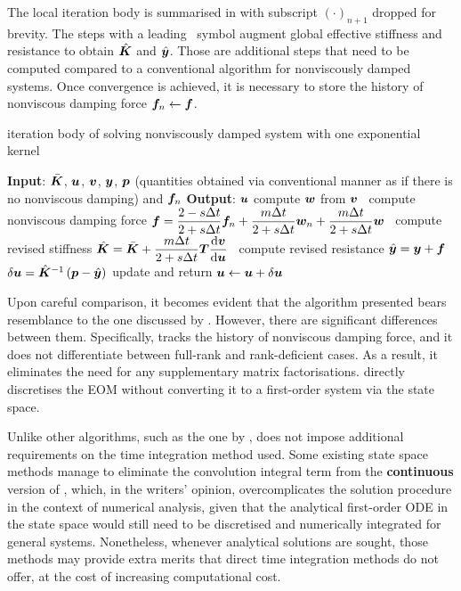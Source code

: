 The local iteration body is summarised in  with subscript $\left(\cdot\right)_{n+1}$ dropped for brevity.
The steps with a leading \faMicrochip~symbol augment global effective stiffness and resistance to obtain $\hat{\bm{K}}$ and $\hat{\bm{y}}$. Those are additional steps that need to be computed compared to a conventional algorithm for nonviscously damped systems. Once convergence is achieved, it is necessary to store the history of nonviscous damping force $\bm{f}_n\leftarrow\bm{f}$.
\begin{breakablealgorithm}
\caption{iteration body of solving nonviscously damped system with one exponential kernel}\label{algo:single_model}
\begin{algorithmic}
\State \textbf{Input}: $\bar{\bm{K}}$, $\bm{u}$, $\bm{v}$, $\bm{y}$, $\bm{p}$ (quantities obtained via conventional manner as if there is no nonviscous damping) and $\bm{f}_n$
\State \textbf{Output}: $\bm{u}$
\State compute $\bm{w}$ from $\bm{v}$
\State \faMicrochip~compute nonviscous damping force $\bm{f}=\dfrac{2-s\Delta{}t}{2+s\Delta{}t}\bm{f}_n+\dfrac{m\Delta{}t}{2+s\Delta{}t}\bm{w}_n+\dfrac{m\Delta{}t}{2+s\Delta{}t}\bm{w}$
\State \faMicrochip~compute revised stiffness $\hat{\bm{K}}=\bar{\bm{K}}+\dfrac{m\Delta{}t}{2+s\Delta{}t}\bm{T}\dfrac{\mathrm{d}\bm{v}}{\mathrm{d}\bm{u}}$
\State \faMicrochip~compute revised resistance $\hat{\bm{y}}=\bm{y}+\bm{f}$
\State $\delta\bm{u}=\hat{\bm{K}}^{-1}\left(\bm{p}-\hat{\bm{y}}\right)$
\State update and return $\bm{u}\leftarrow\bm{u}+\delta\bm{u}$
\end{algorithmic}
\end{breakablealgorithm}

Upon careful comparison, it becomes evident that the algorithm presented bears resemblance to the one discussed by \citet{Adhikari2004}. However, there are significant differences between them. Specifically,  tracks the history of nonviscous damping force, and it does not differentiate between full-rank and rank-deficient cases. As a result, it eliminates the need for any supplementary matrix factorisations.  directly discretises the EOM without converting it to a first-order system via the state space.

Unlike other algorithms, such as the one by \citet{Cortes2009},  does not impose additional requirements on the time integration method used. Some existing state space methods manage to eliminate the convolution integral term from the \textbf{continuous} version of  \citep[see][]{Wagner2003,Wu2019}, which, in the writers' opinion, overcomplicates the solution procedure in the context of numerical analysis, given that the analytical first-order ODE in the state space would still need to be discretised \citep{Adhikari2004} and numerically integrated for general systems. Nonetheless, whenever analytical solutions are sought, those methods may provide extra merits that direct time integration methods do not offer, at the cost of increasing computational cost.
